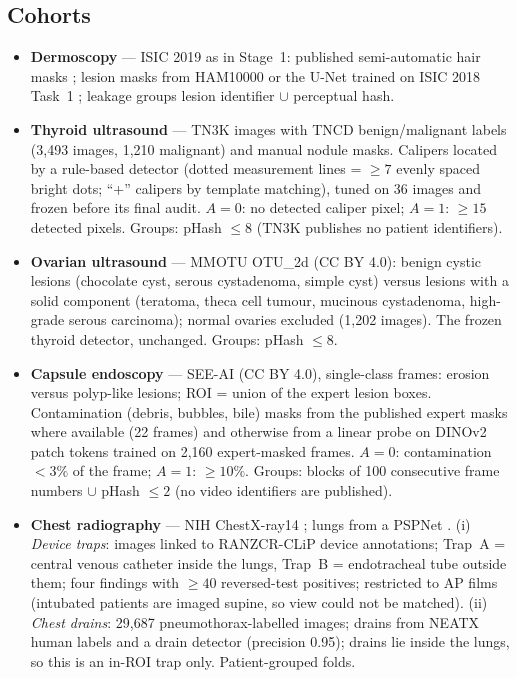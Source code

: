\subsection{Cohorts}
\begin{itemize}[leftmargin=*]\itemsep1pt
\item \textbf{Dermoscopy} --- ISIC 2019 \citep{combalia2019bcn,tschandl2018ham} as in Stage~1: published semi-automatic
hair masks \citep{wegley2026artifacts}; lesion masks from HAM10000 or the U-Net trained on ISIC 2018 Task~1
\citep{codella2019isic}; leakage groups lesion identifier $\cup$ perceptual hash.
\item \textbf{Thyroid ultrasound} --- TN3K images \citep{gong2021tn3k} with TNCD benign/malignant labels (3,493
images, 1,210 malignant) and manual nodule masks. Calipers located by a rule-based detector (dotted measurement lines =
$\ge7$ evenly spaced bright dots; ``+'' calipers by template matching), tuned on 36 images and frozen before its final
audit. $A=0$: no detected caliper pixel; $A=1$: $\ge15$ detected pixels. Groups: pHash $\le8$ (TN3K publishes no
patient identifiers).
\item \textbf{Ovarian ultrasound} --- MMOTU OTU\_2d \citep{zhao2022mmotu} (CC BY 4.0): benign cystic lesions (chocolate
cyst, serous cystadenoma, simple cyst) versus lesions with a solid component (teratoma, theca cell tumour, mucinous
cystadenoma, high-grade serous carcinoma); normal ovaries excluded (1,202 images). The frozen thyroid detector,
unchanged. Groups: pHash $\le8$.
\item \textbf{Capsule endoscopy} --- SEE-AI \citep{seeai2023} (CC BY 4.0), single-class frames: erosion versus
polyp-like lesions; ROI = union of the expert lesion boxes. Contamination (debris, bubbles, bile) masks from the
published expert masks where available (22 frames) and otherwise from a linear probe on DINOv2 patch tokens trained on
2,160 expert-masked frames. $A=0$: contamination $<3\%$ of the frame; $A=1$: $\ge10\%$. Groups: blocks of 100
consecutive frame numbers $\cup$ pHash $\le2$ (no video identifiers are published).
\item \textbf{Chest radiography} --- NIH ChestX-ray14 \citep{wang2017chestxray8}; lungs from a PSPNet
\citep{cohen2022xrv}. (i) \emph{Device traps}: images linked to RANZCR-CLiP device annotations; Trap~A = central venous
catheter inside the lungs, Trap~B = endotracheal tube outside them; four findings with $\ge40$ reversed-test positives;
restricted to AP films (intubated patients are imaged supine, so view could not be matched). (ii) \emph{Chest drains}:
29,687 pneumothorax-labelled images; drains from NEATX human labels and a drain detector (precision 0.95); drains lie
inside the lungs, so this is an in-ROI trap only. Patient-grouped folds.
\end{itemize}
